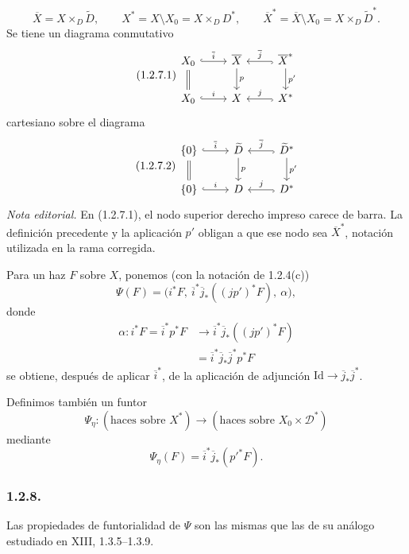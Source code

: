 \[
\overline X=X\times_D\widetilde D,
\qquad
X^*=X\setminus X_0=X\times_DD^*,
\qquad
\overline X^*=\overline X\setminus X_0=X\times_D\widetilde D^*.
\]
Se tiene un diagrama conmutativo
\begin{equation}\tag{1.2.7.1}
\begin{tikzcd}
X_0 \arrow[r, hook, "\overline i"] \arrow[d, equal]
  & \overline X \arrow[d, "p"]
  & \sisi{X^*}{\overline X^*} \arrow[l, hook, "\overline j"']
      \arrow[d, "p'"] \\
X_0 \arrow[r, hook, "i"]
  & X
  & X^* \arrow[l, hook, "j"']
\end{tikzcd}
\end{equation}
cartesiano sobre el diagrama
\begin{equation}\tag{1.2.7.2}
\begin{tikzcd}
\{0\} \arrow[r, hook, "\overline i"] \arrow[d, equal]
  & \widetilde D \arrow[d, "p"]
  & \widetilde D^* \arrow[l, hook, "\overline j"']
      \arrow[d, "p'"] \\
\{0\} \arrow[r, hook, "i"]
  & D
  & D^* \arrow[l, hook, "j"']
\end{tikzcd}
\end{equation}
\noindent\emph{Nota editorial.} En (1.2.7.1), el nodo superior derecho
impreso carece de barra. La definición precedente y la aplicación $p'$ obligan
a que ese nodo sea $\overline X^*$, notación utilizada en la rama corregida.

Para un haz $F$ sobre $X$, ponemos (con la notación de 1.2.4(c))
\[
\Psi(F)=
\bigl(i^*F,\ \overline i^*\overline j_*((jp')^*F),\ \alpha\bigr),
\]
donde
\[
\begin{split}
\alpha:i^*F=\overline i^*p^*F
&\longrightarrow
\overline i^*\overline j_*((jp')^*F)\\
&=\overline i^*\overline j_*\overline j^*p^*F
\end{split}
\]
se obtiene, después de aplicar $\overline i^*$, de la aplicación de adjunción
$\mathrm{Id}\longrightarrow\overline j_*\overline j^*$.

Definimos también un funtor
\[
\Psi_\eta:(\text{haces sobre }X^*)
\longrightarrow(\text{haces sobre }X_0\times\mathcal D^*)
\]
mediante
\[
\Psi_\eta(F)=\overline i^*\overline j_*({p'}^*F).
\]

\subsubsection*{1.2.8.}
Las propiedades de funtorialidad de $\Psi$ son las mismas que las de su
análogo estudiado en XIII, 1.3.5--1.3.9.

